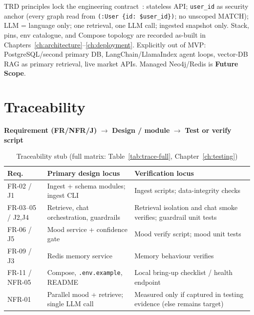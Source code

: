 TRD principles lock the engineering contract~\cite{trd}: stateless API; \texttt{user\_id} as security anchor (every graph read from \texttt{(:User \{id: \$user\_id\})}; no unscoped MATCH); LLM = language only; one retrieval, one LLM call; ingested snapshot only. Stack, pins, env catalogue, and Compose topology are recorded as-built in Chapters~\ref{ch:architecture}--\ref{ch:deployment}. Explicitly out of MVP: PostgreSQL/second primary DB, LangChain/LlamaIndex agent loops, vector-DB RAG as primary retrieval, live market APIs. Managed Neo4j/Redis is \textbf{Future Scope}.

\section{Traceability}

\begin{center}
\textbf{Requirement (FR/NFR/J)} $\rightarrow$ \textbf{Design / module} $\rightarrow$ \textbf{Test or verify script}
\end{center}

\begin{table}[!htbp]
\centering
\small
\caption{Traceability stub (full matrix: Table~\ref{tab:trace-full}, Chapter~\ref{ch:testing})}
\label{tab:trace-stub}
\begin{tabularx}{\textwidth}{@{}
  >{\centering\arraybackslash}p{}
  >{\raggedright\arraybackslash}p{}
  >{\raggedright\arraybackslash}X
  @{}}
\toprule
\textbf{Req.} & \textbf{Primary design locus} & \textbf{Verification locus} \\
\midrule
FR-02 / J1 &
Ingest + schema modules; ingest CLI &
Ingest scripts; data-integrity checks \\
\addlinespace
FR-03--05 / J2,J4 &
Retrieve, chat orchestration, guardrails &
Retrieval isolation and chat smoke verifies; guardrail unit tests \\
\addlinespace
FR-06 / J5 &
Mood service + confidence gate &
Mood verify script; mood unit tests \\
\addlinespace
FR-09 / J3 &
Redis memory service &
Memory behaviour verifies \\
\addlinespace
FR-11 / NFR-05 &
Compose, \texttt{.env.example}, README &
Local bring-up checklist / health endpoint \\
\addlinespace
NFR-01 &
Parallel mood + retrieve; single LLM call &
Measured only if captured in testing evidence (else remains target) \\
\bottomrule
\end{tabularx}
\end{table}
